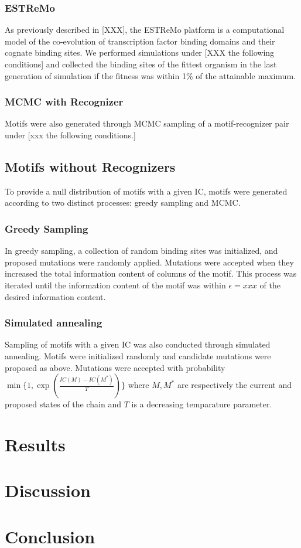 \documentclass{article}
\begin{document}
\subsubsection{ESTReMo}
As previously described in [XXX], the ESTReMo platform is a
computational model of the co-evolution of transcription factor
binding domains and their cognate binding sites.  We performed
simulations under [XXX the following conditions] and collected the
binding sites of the fittest organism in the last generation of
simulation if the fitness was within 1\% of the attainable maximum.

\subsubsection{MCMC with Recognizer}
Motifs were also generated through MCMC sampling of a motif-recognizer pair under [xxx the following conditions.]
\subsection{Motifs without Recognizers}
To provide a null distribution of motifs with a given IC, motifs were
generated according to two distinct processes: greedy sampling and MCMC.
\subsubsection{Greedy Sampling}
In greedy sampling, a collection of random binding sites was
initialized, and proposed mutations were randomly applied.  Mutations
were accepted when they increased the total information content of
columns of the motif.  This process was iterated until the information
content of the motif was within $\epsilon=xxx$ of the desired
information content.

\subsubsection{Simulated annealing}
Sampling of motifs with a given IC was also conducted through
simulated annealing.  Motifs were initialized randomly and candidate
mutations were proposed as above.  Mutations were accepted with
probability $\min\{1,\exp\left(\frac{IC(M)-IC(M^*)}{T}\right)\}$ where
$M,M^*$ are respectively the current and proposed states of the chain
and $T$ is a decreasing temparature parameter.

\section{Results}
\section{Discussion}
\section{Conclusion}
\doublespacing
 \newpage
{}
 \newpage
\end{document}
